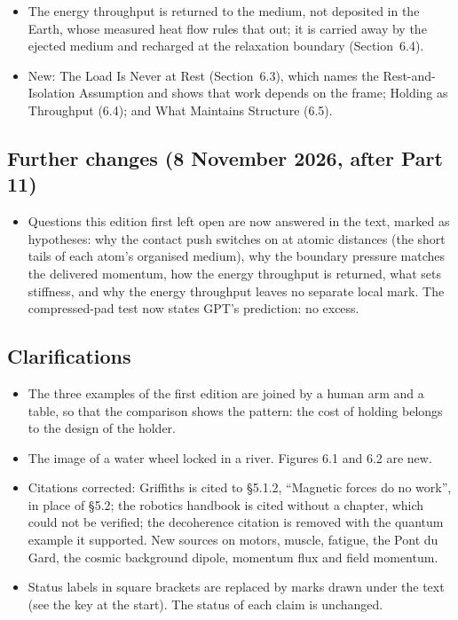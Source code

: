 \documentclass[11pt,a4paper]{article}
\begin{document}
\begin{itemize}
  \item The energy throughput is returned to the medium, not deposited in the Earth, whose measured heat flow rules that out; it is carried away by the ejected medium and recharged at the relaxation boundary (Section~6.4).
  \item New: The Load Is Never at Rest (Section~6.3), which names the Rest-and-Isolation Assumption and shows that work depends on the frame; Holding as Throughput (6.4); and What Maintains Structure (6.5).
\end{itemize}

\subsection*{Further changes (8 November 2026, after Part 11)}
\begin{itemize}
  \item Questions this edition first left open are now answered in the text, marked as hypotheses: why the contact push switches on at atomic distances (the short tails of each atom's organised medium), why the boundary pressure matches the delivered momentum, how the energy throughput is returned, what sets stiffness, and why the energy throughput leaves no separate local mark. The compressed-pad test now states GPT's prediction: no excess.
\end{itemize}

\subsection*{Clarifications}
\begin{itemize}
  \item The three examples of the first edition are joined by a human arm and a table, so that the comparison shows the pattern: the cost of holding belongs to the design of the holder.
  \item The image of a water wheel locked in a river. Figures 6.1 and 6.2 are new.
  \item Citations corrected: Griffiths is cited to \S5.1.2, ``Magnetic forces do no work'', in place of \S5.2; the robotics handbook is cited without a chapter, which could not be verified; the decoherence citation is removed with the quantum example it supported. New sources on motors, muscle, fatigue, the Pont du Gard, the cosmic background dipole, momentum flux and field momentum.
  \item Status labels in square brackets are replaced by marks drawn under the text (see the key at the start). The status of each claim is unchanged.
\end{itemize}

\newpage


\end{document}
